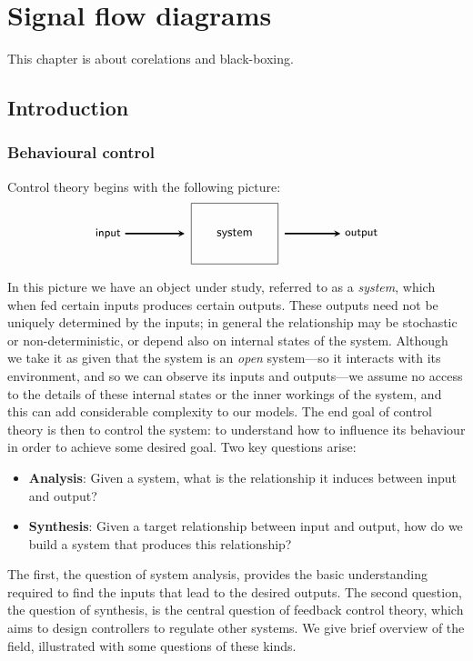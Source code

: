 \chapter{Signal flow diagrams}
This chapter is about corelations and black-boxing.
\section{Introduction}
\subsection{Behavioural control}

Control theory begins with the following picture:		
\[
\begin{tikzpicture}
\node(system) [shape=rectangle,draw,inner sep=20pt] at (0,0) {\textsf{system}};
\node(input) at (-3.5,0) {\small{\textsf{input}}};
\node(output) at (3.5,0) {\small{\textsf{output}}};
\draw [->,shorten >=5pt,>=stealth,very thick] (input) 	-- (system);
\draw [->,shorten <=5pt,>=stealth,very thick] (system)	-- (output);
\end{tikzpicture}
\]
In this picture we have an object under study, referred to as a \emph{system}, which when fed certain inputs produces certain outputs. These outputs need not be uniquely determined by the inputs; in general the relationship may be stochastic or non-deterministic, or depend also on internal states of the system. Although we take it as given that the system is an \emph{open} system---so it interacts with its environment, and so we can observe its inputs and outputs---we assume no access to the details of these internal states or the inner workings of the system, and this can add considerable complexity to our models. The end goal of control theory is then to control the system: to understand how to influence its behaviour in order to achieve some desired goal. Two key questions arise: 
\begin{itemize}
\item \textbf{Analysis}: Given a system, what is the relationship it induces between input and output?
\item \textbf{Synthesis}: Given a target relationship between input and output, how do we build a system that produces this relationship?
\end{itemize}
The first, the question of system analysis, provides the basic understanding required to find the inputs that lead to the desired outputs. The second question, the question of synthesis, is the central question of feedback control theory, which aims to design controllers to regulate other systems. We give brief overview of the field, illustrated with some questions of these kinds.

